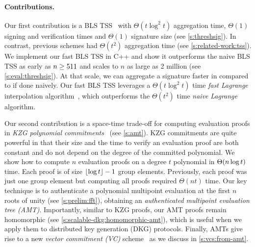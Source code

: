 \paragraph{Contributions.}

Our first contribution is a BLS TSS~\cite{Boldyreva03} with $\Theta(t\log^2{t})$ aggregation time, $\Theta(1)$ signing and verification times and $\Theta(1)$ signature size (see \cref{s:threshsig}).
In contrast, previous schemes had $\Theta(t^2)$ aggregation time (see \cref{s:related-work:tss}).
We implement our fast BLS TSS in C++ and show it outperforms the naive BLS TSS as early as $n\ge 511$ and scales to $n$ as large as 2 million (see \cref{s:eval:threshsig}).
At that scale, we can aggregate a signature  faster in  compared to  if done naively.
Our fast BLS TSS leverages a $\Theta(t\log^2{t})$ time \textit{fast Lagrange} interpolation algorithm~\cite{vG13ModernCh10}, which outperforms the $\Theta(t^2)$ time \textit{naive} \textit{Lagrange} algorithm.

\vssDkgPreviousWorkTable

Our second contribution is a space-time trade-off for computing evaluation proofs in \textit{KZG polynomial commitments}~\cite{KZG10a} (see \cref{s:amt}).
KZG commitments are quite powerful in that their size and the time to verify an evaluation proof are both constant and do not depend on the degree of the committed polynomial.
We show how to compute $n$ evaluation proofs on a degree $t$ polynomial in $\Theta(n\log{t})$ time.
Each proof is of size $\lfloor\log{t}\rfloor-1$ group elements.
Previously, each proof was just one group element but computing all proofs required $\Theta(nt)$ time.
Our key technique is to authenticate a polynomial multipoint evaluation at the first $n$ roots of unity (see \cref{s:prelim:fft}), obtaining an \textit{authenticated multipoint evaluation tree (AMT)}.
Importantly, similar to KZG proofs, our AMT proofs remain homomorphic (see \cref{s:scalable-dkg:homomorphic-amt}), which is useful when we apply them to distributed key generation (DKG) protocols.
Finally, AMTs give rise to a new \textit{vector commitment (VC)} scheme~\cite{CF13,CPZ18} as we discuss in \cref{s:vcs:from-amt}.

